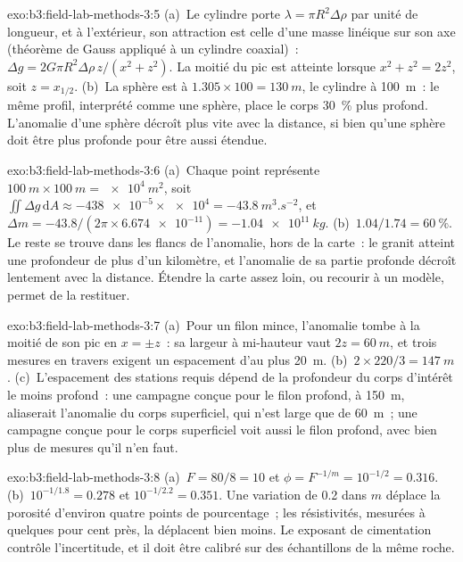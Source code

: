 \begin{solution}{exo:b3:field-lab-methods-3:5}
(a)~Le cylindre porte $\lambda = \pi R^2\Delta\rho$ par unité de longueur, et
à l'extérieur, son attraction est celle d'une masse linéique sur son axe (théorème de Gauss
appliqué à un cylindre coaxial)~: $\Delta g = 2G\pi R^2\Delta\rho\,z/(x^2
+ z^2)$. La moitié du pic est atteinte lorsque $x^2 + z^2 = 2z^2$, soit $z =
x_{1/2}$. (b)~La sphère est à $1.305\times100 = \qty{130}{m}$, le
cylindre à \qty{100}{m}~: le même profil, interprété comme une sphère, place le
corps \qty{30}{\percent} plus profond. L'anomalie d'une sphère décroît plus vite avec
la distance, si bien qu'une sphère doit être plus profonde pour être aussi étendue.
\end{solution}

\begin{solution}{exo:b3:field-lab-methods-3:6}
(a)~Chaque point représente $\qty{100}{m}\times\qty{100}{m} =
\qty{e4}{m^2}$, soit $\iint\Delta g\,\mathrm{d}A \approx
\num{-438e-5}\times\num{e4} = \qty{-43.8}{m^3.s^{-2}}$, et $\Delta m
= -43.8/(2\pi\times\num{6.674e-11}) = \qty{-1.04e11}{kg}$. (b)~$1.04/1.74
= \qty{60}{\percent}$. Le reste se trouve dans les flancs de l'anomalie, hors
de la carte~: le granit atteint une profondeur de plus d'un kilomètre, et
l'anomalie de sa partie profonde décroît lentement avec la distance. Étendre la carte
assez loin, ou recourir à un modèle, permet de la restituer.
\end{solution}

\begin{solution}{exo:b3:field-lab-methods-3:7}
(a)~Pour un filon mince, l'anomalie tombe à la moitié de son pic en $x = \pm z$~:
sa largeur à mi-hauteur vaut $2z = \qty{60}{m}$, et trois
mesures en travers exigent un espacement d'au plus \qty{20}{m}. (b)~$2\times
220/3 = \qty{147}{m}$. (c)~L'espacement des stations requis dépend de la
profondeur du corps d'intérêt le moins profond~: une campagne conçue pour le
filon profond, à \qty{150}{m}, aliaserait l'anomalie du corps superficiel, qui
n'est large que de \qty{60}{m}~; une campagne conçue pour le corps superficiel voit aussi le
filon profond, avec bien plus de mesures qu'il n'en faut.
\end{solution}

\begin{solution}{exo:b3:field-lab-methods-3:8}
(a)~$F = 80/8 = 10$ et $\phi = F^{-1/m} = 10^{-1/2} = \num{0.316}$.
(b)~$10^{-1/1.8} = \num{0.278}$ et $10^{-1/2.2} = \num{0.351}$. Une variation
de \num{0.2} dans $m$ déplace la porosité d'environ quatre points de pourcentage~;
les résistivités, mesurées à quelques pour cent près, la déplacent bien moins. Le
exposant de cimentation contrôle l'incertitude, et il doit être calibré
sur des échantillons de la même roche.
\end{solution}

